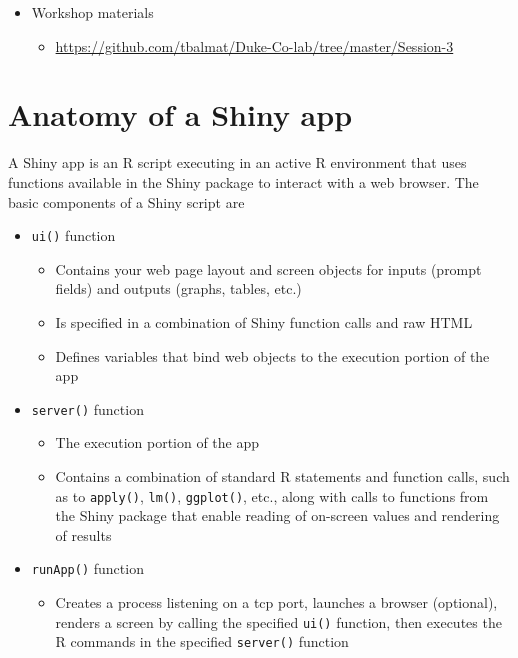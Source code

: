 \documentclass[10pt, letterpaper]{article}
\begin{document}
\begin{spacing}{1.0}
\begin{itemize}
  \item Workshop materials
    \begin{itemize}[noitemsep]
        \item \url{https://github.com/tbalmat/Duke-Co-lab/tree/master/Session-3}
    \end{itemize}
\end{itemize}


\section{Anatomy of a Shiny app}\label{sec:anatomyofapp}

A Shiny app is an R script executing in an active R environment that uses functions available in the Shiny package to interact with a web browser.  The basic components of a Shiny script are

\begin{itemize}
    \item \texttt{ui()} function
    \begin{itemize}[noitemsep]
        \item Contains your web page layout and screen objects for inputs (prompt fields) and outputs (graphs, tables, etc.)
        \item Is specified in a combination of Shiny function calls and raw HTML
        \item Defines variables that bind web objects to the execution portion of the app
    \end{itemize}
    \item \texttt{server()} function
    \begin{itemize}[noitemsep]
        \item The execution portion of the app
        \item Contains a combination of standard R statements and function calls, such as to \texttt{apply()}, \texttt{lm()}, \texttt{ggplot()}, etc., along with calls to functions from the Shiny package that enable reading of on-screen values and rendering of results
    \end{itemize}
    \item \texttt{runApp()} function
    \begin{itemize}[noitemsep]
        \item Creates a process listening on a tcp port, launches a browser (optional), renders a screen by calling the specified \texttt{ui()} function, then executes the R commands in the specified \texttt{server()} function
    \end{itemize}
\end{itemize}


\end{spacing}
\end{document}
